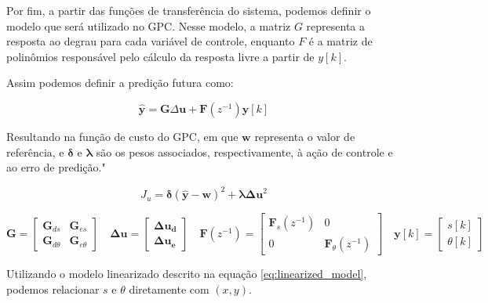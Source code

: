 Por fim, a partir das funções de transferência do sistema,
podemos definir o modelo que será utilizado no GPC.
Nesse modelo, a matriz $G$ representa a resposta ao degrau para cada variável de controle,
enquanto $F$ é a matriz de polinômios responsável pelo cálculo da
resposta livre a partir de $y[k]$.

Assim podemos definir a predição futura como: 

\begin{equation}
\hat{\mathbf{y}} = \mathbf{G} \Delta \mathbf{u} + \mathbf{F}(z^{-1}) \mathbf{y}[k]
\end{equation}

Resultando na função de custo do GPC, em que $\mathbf{w}$ representa o valor de 
referência, e $\boldsymbol{\delta}$ e $\boldsymbol{\lambda}$ são os pesos associados, 
respectivamente, à ação de controle e ao erro de predição."

\begin{equation}
J_u = \boldsymbol{\delta} (\hat{\mathbf{y}} - \mathbf{w})^2 + \boldsymbol{\lambda} \mathbf{\Delta u}^2
\end{equation}

\[
\mathbf{G} = 
\begin{bmatrix}
\mathbf{G}_{d s} & \mathbf{G}_{e s}\\
\mathbf{G}_{d \theta}  & \mathbf{G}_{e \theta}
\end{bmatrix}
\quad
\mathbf{\Delta u} =
\begin{bmatrix}
\mathbf{\Delta u_d} \\
\mathbf{\Delta u_e}
\end{bmatrix}
\quad
\mathbf{F}(z^{-1}) =
\begin{bmatrix}
\mathbf{F}_{s}(z^{-1}) & 0\\
0 & \mathbf{F}_{\theta}(z^{-1})
\end{bmatrix}
\quad
\mathbf{y}[k] =
\begin{bmatrix}
s[k] \\
\theta[k]
\end{bmatrix}
\]

Utilizando o modelo linearizado descrito na equação \ref{eq:linearized_model},
podemos relacionar $s$ e $\theta$ diretamente com $(x, y)$.